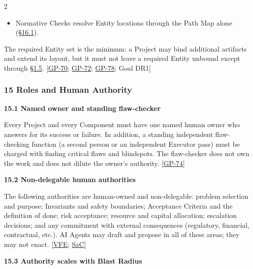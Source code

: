 \begin{multicols}{2}
\begin{itemize}
\item Normative Checks resolve Entity locations through the Path Map alone (\hyperlink{nss-16.1}{\S16.1}).

\end{itemize}

The required Entity set is the minimum: a Project may bind additional artifacts and extend its layout, but it must not leave a required Entity unbound except through \hyperlink{nss-1.5}{\S1.5}. [\hyperlink{gp-70}{GP-70}; \hyperlink{gp-72}{GP-72}; \hyperlink{gp-78}{GP-78}; Goal DR1]

\hypertarget{nss-15}{}

\subsubsection*{15 Roles and Human Authority}

\hypertarget{nss-15.1}{}

\par\smallskip\noindent\textbf{15.1 Named owner and standing flaw-checker}\par\nopagebreak

Every Project and every Component must have one named human owner who answers for its success or failure. In addition, a standing independent flaw-checking function (a second person or an independent Executor pass) must be charged with finding critical flaws and blindspots. The flaw-checker does not own the work and does not dilute the owner's authority. [\hyperlink{gp-74}{GP-74}]

\hypertarget{nss-15.2}{}

\par\smallskip\noindent\textbf{15.2 Non-delegable human authorities}\par\nopagebreak

The following authorities are human-owned and non-delegable: problem selection and purpose; Invariants and safety boundaries; Acceptance Criteria and the definition of done; risk acceptance; resource and capital allocation; escalation decisions; and any commitment with external consequences (regulatory, financial, contractual, etc.). AI Agents may draft and propose in all of these areas; they may not enact. [\hyperlink{gp-VFE}{VFE}; \hyperlink{gp-SaC}{SaC}]

\hypertarget{nss-15.3}{}

\par\smallskip\noindent\textbf{15.3 Authority scales with Blast Radius}\par\nopagebreak


\end{multicols}
